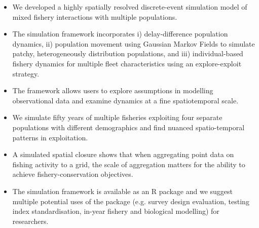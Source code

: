 \documentclass{article}
\begin{document}
\begin{itemize}

	\item We developed a highly spatially resolved discrete-event
		simulation model of mixed fishery interactions with multiple
		populations.	
	\item The simulation framework incorporates i) delay-difference population
		dynamics, ii) population movement using Gaussian Markov Fields
		to simulate patchy, heterogeneously distribution populations,
		and iii) individual-based fishery dynamics for multiple fleet
		characteristics using an explore-exploit strategy.
	\item The framework allows users to explore assumptions in modelling
		observational data and examine dynamics at a fine
		spatiotemporal scale. 
	\item We simulate fifty years of multiple fisheries exploiting four
		separate populations with different demographics and find
		nuanced spatio-temporal patterns in exploitation.
	\item A simulated spatial closure shows that when aggregating point
		data on fishing activity to a grid, the scale of aggregation
		matters for the ability to achieve fishery-conservation
		objectives.
	\item The simulation framework is available as an R package and we
		suggest multiple potential uses of the package (e.g. survey
		design evaluation, testing index standardisation, in-year
		fishery and biological modelling) for researchers.

\end{itemize}
\end{document}
